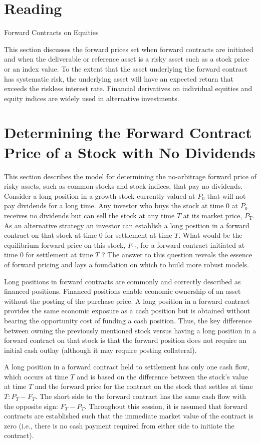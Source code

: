 \documentclass[11pt]{article}
\begin{document}
\section*{Reading}
Forward Contracts on Equities

This section discusses the forward prices set when forward contracts are initiated and when the deliverable or reference asset is a risky asset such as a stock price or an index value. To the extent that the asset underlying the forward contract has systematic risk, the underlying asset will have an expected return that exceeds the riskless interest rate. Financial derivatives on individual equities and equity indices are widely used in alternative investments.

\section*{Determining the Forward Contract Price of a Stock with No Dividends}
This section describes the model for determining the no-arbitrage forward price of risky assets, such as common stocks and stock indices, that pay no dividends. Consider a long position in a growth stock currently valued at $P_{0}$ that will not pay dividends for a long time. Any investor who buys the stock at time 0 at $P_{0}$ receives no dividends but can sell the stock at any time $T$ at its market price, $P_{\mathrm{T}}$. As an alternative strategy an investor can establish a long position in a forward contract on that stock at time 0 for settlement at time $T$. What would be the equilibrium forward price on this stock, $F_{\mathrm{T}}$, for a forward contract initiated at time 0 for settlement at time $T$ ? The answer to this question reveals the essence of forward pricing and lays a foundation on which to build more robust models.

Long positions in forward contracts are commonly and correctly described as financed positions. Financed positions enable economic ownership of an asset without the posting of the purchase price. A long position in a forward contract provides the same economic exposure as a cash position but is obtained without bearing the opportunity cost of funding a cash position. Thus, the key difference between owning the previously mentioned stock versus having a long position in a forward contract on that stock is that the forward position does not require an initial cash outlay (although it may require posting collateral).

A long position in a forward contract held to settlement has only one cash flow, which occurs at time $T$ and is based on the difference between the stock's value at time $T$ and the forward price for the contract on the stock that settles at time $T: P_{T}-F_{T}$. The short side to the forward contract has the same cash flow with the opposite sign: $F_{T}-P_{T}$. Throughout this session, it is assumed that forward contracts are established such that the immediate market value of the contract is zero (i.e., there is no cash payment required from either side to initiate the contract).
\end{document}
